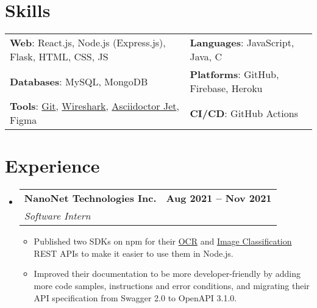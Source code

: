 \documentclass[letterpaper,11pt]{article}
\makeatletter
\newcommand{\resumeItem}[1]{
  \item\small{
    {#1 \vspace{-2pt}}
  }
}
\newcommand{\resumeSubheading}[4]{
  \vspace{-2pt}\item
    \begin{tabular*}{1.0\textwidth}[t]{l@{\extracolsep{\fill}}r}
      \vspace{-2pt}\textbf{#1} & \textbf{\small #2} \\
      \textit{\small#3} & \textit{\small #4} \\
    \end{tabular*}\vspace{-7pt}
}
\newcommand{\resumeSubHeadingListStart}{\begin{itemize}[leftmargin=0.0in, label={}]}
\newcommand{\resumeSubHeadingListEnd}{\end{itemize}}
\newcommand{\resumeItemListStart}{\begin{itemize}}
\newcommand{\resumeItemListEnd}{\end{itemize}\vspace{-5pt}}
\makeatother
\begin{document}
\section{Skills}
    \vspace{-4pt}
    \begin{itemize}[leftmargin=0.2in, label={}]
        {\item{
            \begin{tabular}{ l@{\hskip 0.2in} l }
                 \textbf{Web}: React.js, Node.js (Express.js), Flask, HTML, CSS, JS & \textbf{Languages}: JavaScript, Java, C \\ 
                 \textbf{Databases}: MySQL, MongoDB & \textbf{Platforms}: GitHub, Firebase, Heroku \\  
                 \textbf{Tools}: \href{https://git.harshkapadia.me}{Git}, \href{https://networking.harshkapadia.me}{Wireshark}, \href{https://harshkapadia2.github.io/asciidoctor-jet}{Asciidoctor Jet}, Figma & \textbf{CI/CD}: GitHub Actions
            \end{tabular}
        }}
    \end{itemize}
\vspace{-22pt}


\section{Experience}
    \vspace{-2pt}
    \resumeSubHeadingListStart
        \resumeSubheading
            {NanoNet Technologies Inc.}{Aug 2021 -- Nov 2021}
            {Software Intern}{}
            \resumeItemListStart
                \resumeItem{Published two SDKs on npm for their \href{https://www.npmjs.com/package/@nanonets/optical-character-recognition}{OCR} and \href{https://www.npmjs.com/package/@nanonets/image-classification}{Image Classification} REST APIs to make it easier to use them in Node.js.}
                \resumeItem{Improved their documentation to be more developer-friendly by adding more code samples, instructions and error conditions, and migrating their API specification from Swagger 2.0 to OpenAPI 3.1.0.}
            \resumeItemListEnd
    \resumeSubHeadingListEnd
\vspace{-20pt}


\end{document}
